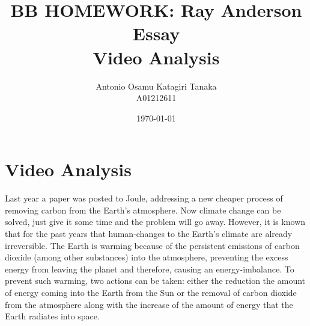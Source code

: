 \documentclass[11pt,a4paper]{article}
\title
{
    BB HOMEWORK: Ray Anderson Essay \\
    Video Analysis
}
\author
{
    Antonio Osamu Katagiri Tanaka \\
    A01212611
}
\date{\today}
\providecommand{\keywords}[1]
{
    \\
    \\
    \small
    \textbf{\textit{Keywords:}} #1
}
\begin{document}

\maketitle


\clearpage






\section{Video Analysis}\label{sec:intro}
Last year a paper was posted to Joule, addressing a new cheaper process of removing carbon from the Earth's atmosphere. \parencite{Keith2018} Now climate change can be solved, just give it some time and the problem will go away. However, it is known that for the past years that human-changes to the Earth's climate are already irreversible. \parencite{Solomon2009} The Earth is warming because of the persistent emissions of carbon dioxide (among other substances) into the atmosphere, preventing the excess energy from leaving the planet and therefore, causing an energy-imbalance. To prevent such warming, two actions can be taken: either the reduction the amount of energy coming into the Earth from the Sun or the removal of carbon dioxide from the atmosphere along with the increase of the amount of energy that the Earth radiates into space.
\end{document}
